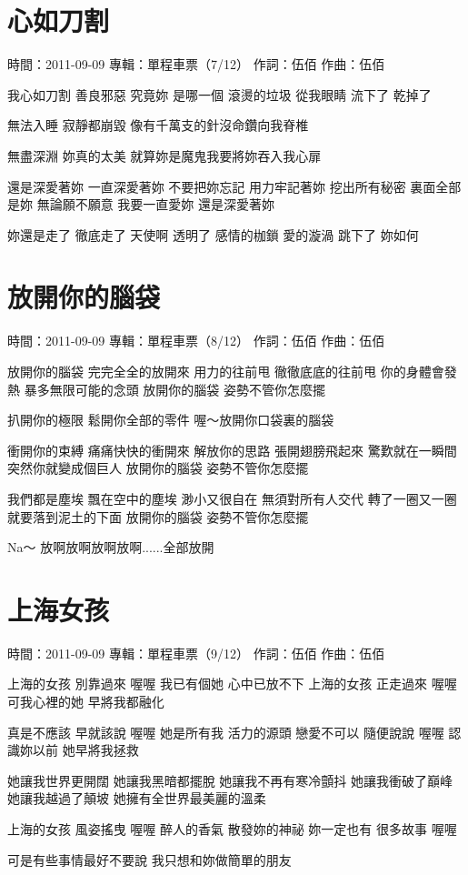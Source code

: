 \documentclass[UTF8,a4paper,oneside,twocolumn,12pt]{ctexbook}
\newcommand{\infopair}[2]{\textbullet #1：#2}
\newcommand{\zc}[1][伍佰]{\infopair{作詞}{#1}}
\newcommand{\zq}[1][伍佰]{\infopair{作曲}{#1}}
\newcommand{\zj}[1]{\infopair{專輯}{#1}}
\newcommand{\sj}[1]{\infopair{時間}{#1}}
\newenvironment{info}{\begin{flushleft}\kaishu
	}
	{\end{flushleft}\normalsize\yahei\par}
\newenvironment{lyric}{
	}
{}
\begin{document}
\section{心如刀割}
\begin{info}
	\sj{2011-09-09}
	\zj{單程車票（7/12）}
	\zc
	\zq
\end{info}
\begin{lyric}
	我心如刀割 善良邪惡 究竟妳 是哪一個
	滾燙的垃圾 從我眼睛 流下了 乾掉了

	無法入睡 寂靜都崩毀
	像有千萬支的針沒命鑽向我脊椎

	無盡深淵 妳真的太美
	就算妳是魔鬼我要將妳吞入我心扉

	還是深愛著妳 一直深愛著妳
	不要把妳忘記 用力牢記著妳
	挖出所有秘密 裏面全部是妳
	無論願不願意 我要一直愛妳
	還是深愛著妳

	妳還是走了 徹底走了 天使啊 透明了
	感情的枷鎖 愛的漩渦 跳下了 妳如何
\end{lyric}

\section{放開你的腦袋}
\begin{info}
	\sj{2011-09-09}
	\zj{單程車票（8/12）}
	\zc
	\zq
\end{info}
\begin{lyric}
	放開你的腦袋
	完完全全的放開來
	用力的往前甩
	徹徹底底的往前甩
	你的身體會發熱
	暴多無限可能的念頭
	放開你的腦袋
	姿勢不管你怎麼擺

	扒開你的極限
	鬆開你全部的零件
	喔～放開你口袋裏的腦袋

	衝開你的束縛
	痛痛快快的衝開來
	解放你的思路
	張開翅膀飛起來
	驚歎就在一瞬間
	突然你就變成個巨人
	放開你的腦袋
	姿勢不管你怎麼擺

	我們都是塵埃
	飄在空中的塵埃
	渺小又很自在
	無須對所有人交代
	轉了一圈又一圈
	就要落到泥土的下面
	放開你的腦袋
	姿勢不管你怎麼擺

	Na～
	放啊放啊放啊放啊......全部放開
\end{lyric}

\section{上海女孩}
\begin{info}
	\sj{2011-09-09}
	\zj{單程車票（9/12）}
	\zc
	\zq
\end{info}
\begin{lyric}
	上海的女孩 別靠過來 喔喔
	我已有個她 心中已放不下
	上海的女孩 正走過來 喔喔
	可我心裡的她 早將我都融化

	真是不應該 早就該說 喔喔
	她是所有我 活力的源頭
	戀愛不可以 隨便說說 喔喔
	認識妳以前 她早將我拯救

	她讓我世界更開闊
	她讓我黑暗都擺脫
	她讓我不再有寒冷顫抖
	她讓我衝破了巔峰
	她讓我越過了顛坡
	她擁有全世界最美麗的溫柔

	上海的女孩 風姿搖曳 喔喔
	醉人的香氣 散發妳的神祕
	妳一定也有 很多故事 喔喔

	可是有些事情最好不要說
	我只想和妳做簡單的朋友
\end{lyric}
\end{document}
